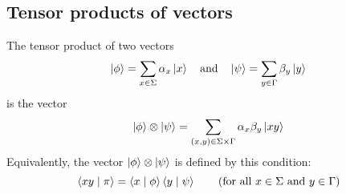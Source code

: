 \documentclass{report}
\begin{document}
\subsection{Tensor products of vectors}
The tensor product of two vectors
\begin{equation*}
    \ket{\phi}=\sum\limits_{x\in\Sigma}\alpha_x\ket{x} \quad \text{and} \quad \ket{\psi}=\sum\limits_{y\in\Gamma}\beta_y\ket{y}
\end{equation*}
is the vector
\begin{equation*}
    \ket{\phi}\otimes\ket{\psi}=\sum\limits_{(x,y)\in\Sigma\times\Gamma}\alpha_x\beta_y\ket{xy}
\end{equation*}
Equivalently, the vector $\ket{\phi}\otimes\ket{\psi}$ is defined by this condition:
\begin{equation*}
    \braket{xy\mid\pi}=\braket{x\mid\phi}\braket{y\mid\psi} \qquad \text{(for all } x\in\Sigma \text{ and } y\in\Gamma \text{)}
\end{equation*}

\end{document}
